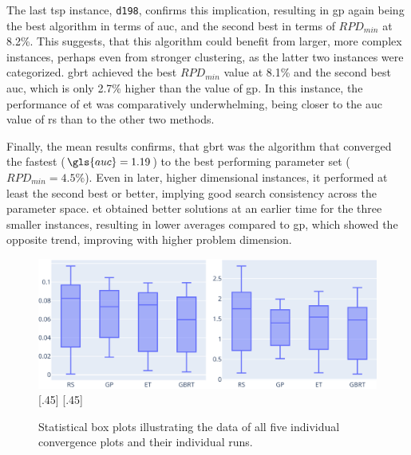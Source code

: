 The last \gls{tsp} instance, \texttt{d198}, confirms this implication, resulting in \gls{gp} again being the best algorithm in terms of \gls{auc}, and the second best in terms of $RPD_{min}$ at 8.2\%. This suggests, that this algorithm could benefit from larger, more complex instances, perhaps even from stronger clustering, as the latter two instances were categorized. \gls{gbrt} achieved the best $RPD_{min}$ value at 8.1\% and the second best \gls{auc}, which is only 2.7\% higher than the value of \gls{gp}. In this instance, the performance of \gls{et} was comparatively underwhelming, being closer to the \gls{auc} value of \gls{rs} than to the other two methods.

Finally, the mean results confirms, that \gls{gbrt} was the algorithm that converged the fastest ($\gls{auc} = 1.19$) to the best performing parameter set ($RPD_{min} = 4.5\%$). Even in later, higher dimensional  instances, it performed at least the second best or better, implying good search consistency across the parameter space. \gls{et} obtained better solutions at an earlier time for the three smaller instances, resulting in lower averages compared to \gls{gp}, which showed the opposite trend, improving with higher problem dimension.

\begin{figure}[h]
	\centering
	\includegraphics[width=\textwidth]{results/part1/convergence_stats_boxplot.svg}
\captionsetup[subfigure]
{skip=-8pt}
		\hfill
		[.45\linewidth]{\hfill}
		\hfill
		[.45\linewidth]{\hfill}

	\caption[Statistical box plots illustrating convergence plots]{Statistical box plots illustrating the data of all five individual convergence plots and their individual runs.}
\label{fig:convergence_stats_boxplots}
\end{figure}

